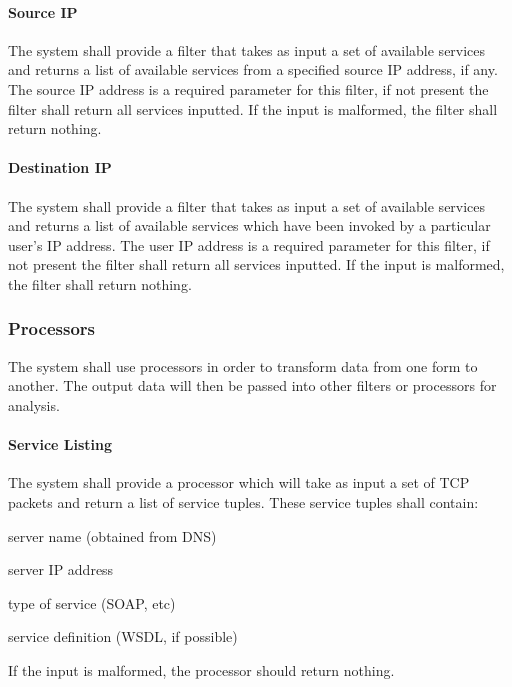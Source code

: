 \documentclass[titlepage]{article}
\begin{document}
\paragraph{Source IP}

The system shall provide a filter that takes as input a set of available
services and returns a list of available services from a specified source IP
address, if any.  The source IP address is a required parameter for this
filter, if not present the filter shall return all services inputted.  If the
input is malformed, the filter shall return nothing.

\paragraph{Destination IP}

The system shall provide a filter that takes as input a set of available
services and returns a list of available services which have been invoked by a
particular user's IP address.  The user IP address is a required parameter for
this filter, if not present the filter shall return all services inputted.  If
the input is malformed, the filter shall return nothing.


\subsubsection{Processors}

The system shall use processors in order to transform data from one
form to another.  The output data will then be passed into other filters or
processors for analysis.

\paragraph{Service Listing}

The system shall provide a processor which will take as input a set of TCP
packets and return a list of service tuples.  These service tuples shall
contain:
\begin{itemize*}
    \item server name (obtained from DNS)
    \item server IP address
    \item type of service (SOAP, etc)
    \item service definition (WSDL, if possible)
\end{itemize*}
If the input is malformed, the processor should return nothing.
\end{document}
